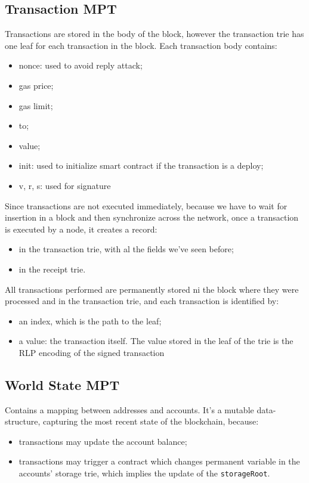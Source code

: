 \subsection{Transaction MPT}
Transactions are stored in the body of the block, however the transaction trie has one leaf for each transaction in the block.
Each transaction body contains:
\begin{itemize}
    \item nonce: used to avoid reply attack;
    \item gas price;
    \item gas limit;
    \item to;
    \item value;
    \item init: used to initialize smart contract if the transaction is a deploy;
    \item v, r, s: used for signature
\end{itemize}

Since transactions are not executed immediately, because we have to wait for insertion in a block and then synchronize across the network, once a transaction is executed by a node, it creates a record:
\begin{itemize}
    \item in the transaction trie, with al the fields we've seen before;
    \item in the receipt trie.
\end{itemize}
All transactions performed are permanently stored ni the block where they were processed and in the transaction trie, and each transaction is identified by:
\begin{itemize}
    \item an index, which is the path to the leaf;
    \item a value: the transaction itself.
    The value stored in the leaf of the trie is the RLP encoding of the signed transaction
\end{itemize}

\subsection{World State MPT}
Contains a mapping between addresses and accounts.
It's a mutable data-structure, capturing the most recent state of the blockchain, because:
\begin{itemize}
    \item transactions may update the account balance;
    \item transactions may trigger a contract which changes permanent variable in the accounts' storage trie, which implies the update of the \verb|storageRoot|.
\end{itemize}

